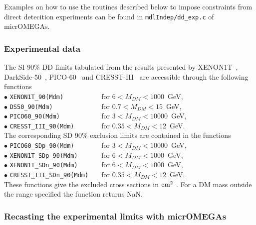 \documentclass[12pt,a4paper]{article}
\begin{document}
Examples on how to use the routines described below to impose constraints from direct detecition experiments  can be found  in \verb|mdlIndep/dd_exp.c| of micrOMEGAs. 
\subsubsection{Experimental data}

The SI 90\%  DD  limits  tabulated from the results presented by  XENON1T~\cite{Aprile:2018dbl}, DarkSide-50~\cite{Agnes:2018ves}, PICO-60~\cite{Amole:2019fdf}  and CRESST-III~\cite{Abdelhameed:2019hmk}  are accessible through  the following functions \\

\noindent
$\bullet$ \verb|XENON1T_90(Mdm)          | for  $ 6 <  M_{DM} < 1000$~GeV, \cite{Aprile:2018dbl}  \\
\noindent
$\bullet$ \verb|DS50_90(Mdm)             | for  $ 0.7 < M_{DM} < 15$~GeV, \cite{Agnes:2018ves}   \\
\noindent
$\bullet$ \verb|PICO60_90(Mdm)           | for  $ 3 < M_{DM} < 10000$~GeV, \cite{Amole:2019fdf}   \\
\noindent
$\bullet$ \verb|CRESST_III_90(Mdm)       |  for $ 0.35 < M_{DM} < 12$~GeV{\color{blue}.}\cite{Abdelhameed:2019hmk} \\



The corresponding SD 90\% exclusion limits are contained in the functions\\

\noindent 
$\bullet$ \verb|PICO60_SDp_90(Mdm)       | for  $ 3 < M_{DM} < 10000$~GeV,  \cite{Amole:2019fdf} \\
\noindent
$\bullet$ \verb|XENON1T_SDp_90(Mdm)      | for  $ 6 <  M_{DM} < 1000$~GeV, \cite{Aprile:2019dbj} \\
\noindent
$\bullet$ \verb|XENON1T_SDn_90(Mdm)      | for  $ 6 <  M_{DM} < 1000$~GeV, \cite{Aprile:2019dbj} \\
\noindent
$\bullet$ \verb|CRESST_III_SDn_90(Mdm)   |  for $ 0.35 < M_{DM} < 12$~GeV. ~\cite{Abdelhameed:2019hmk}\\


These functions give the  excluded cross sections in ${\rm cm}^2$ . For a DM mass outside the range specified the function returns NaN.

\subsubsection{Recasting the experimental limits with  micrOMEGAs}  
\end{document}
